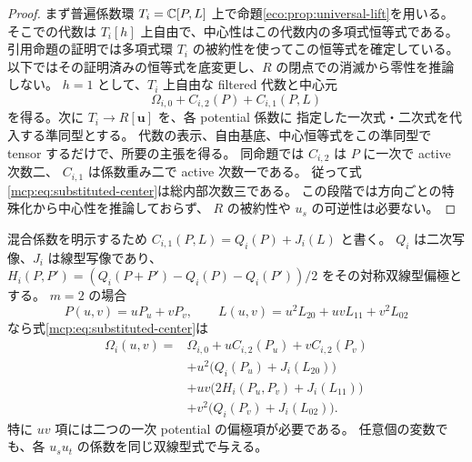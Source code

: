 \begin{proof}
まず普遍係数環 $T_i=\mathbb C[P,L]$ 上で命題\ref{eco:prop:universal-lift}を用いる。
そこでの代数は $T_i[h]$ 上自由で、中心性はこの代数内の多項式恒等式である。
引用命題の証明では多項式環 $T_i$ の被約性を使ってこの恒等式を確定している。
以下ではその証明済みの恒等式を底変更し、$R$ の閉点での消滅から零性を推論しない。
$h=1$ として、$T_i$ 上自由な filtered 代数と中心元
\[
       \Omega_{i,0}+C_{i,2}(P)+C_{i,1}(P,L)
\]
を得る。次に $T_i\to R[\mathbf u]$ を、各 potential 係数に
指定した一次式・二次式を代入する準同型とする。
代数の表示、自由基底、中心恒等式をこの準同型で tensor するだけで、所要の主張を得る。
同命題では $C_{i,2}$ は $P$ に一次で active 次数二、
$C_{i,1}$ は係数重み二で active 次数一である。
従って式\eqref{mcp:eq:substituted-center}は総内部次数三である。
この段階では方向ごとの特殊化から中心性を推論しておらず、
$R$ の被約性や $u_s$ の可逆性は必要ない。
\end{proof}

混合係数を明示するため $C_{i,1}(P,L)=Q_i(P)+J_i(L)$ と書く。
$Q_i$ は二次写像、$J_i$ は線型写像であり、
$H_i(P,P')=(Q_i(P+P')-Q_i(P)-Q_i(P'))/2$ をその対称双線型偏極とする。
$m=2$ の場合
\[
 P(u,v)=uP_u+vP_v,\qquad
 L(u,v)=u^2L_{20}+uvL_{11}+v^2L_{02}
\]
なら式\eqref{mcp:eq:substituted-center}は
\begin{equation}\label{mcp:eq:two-variable-polarization}
 \begin{aligned}
 \Omega_i(u,v)={}&\Omega_{i,0}
   +uC_{i,2}(P_u)+vC_{i,2}(P_v)\\
 &+u^2\bigl(Q_i(P_u)+J_i(L_{20})\bigr)\\
 &+uv\bigl(2H_i(P_u,P_v)+J_i(L_{11})\bigr)\\
 &+v^2\bigl(Q_i(P_v)+J_i(L_{02})\bigr).
 \end{aligned}
\end{equation}
特に $uv$ 項には二つの一次 potential の偏極項が必要である。
任意個の変数でも、各 $u_su_t$ の係数を同じ双線型式で与える。

